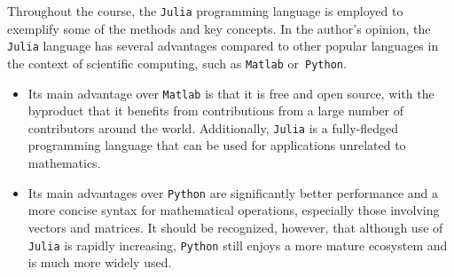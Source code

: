 Throughout the course, the \texttt{Julia} programming language is employed to exemplify some of the methods and key concepts.
In the author's opinion,
the \texttt{Julia} language has several advantages compared to other popular languages in the context of scientific computing,
such as \texttt{Matlab} or~\texttt{Python}.
%
\begin{itemize}
    \item
        Its main advantage over \texttt{Matlab} is that it is free and open source,
        with the byproduct that it benefits from contributions from a large number of contributors around the world.
        Additionally, \texttt{Julia} is a fully-fledged programming language that can be used for applications unrelated to mathematics.

    \item
        Its main advantages over \texttt{Python} are significantly better performance and a more concise syntax for mathematical operations,
        especially those involving vectors and matrices.
        It should be recognized, however, that although use of \texttt{Julia} is rapidly increasing,
        \texttt{Python} still enjoys a more mature ecosystem and is much more widely used.
\end{itemize}
